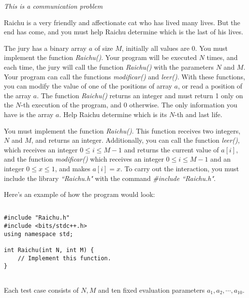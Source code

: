 \documentclass[12pt]{scrartcl}
\begin{document}
    
    {\itshape This is a communication problem}
    
    \vspace{10pt}

        Raichu is a very friendly and affectionate cat who has lived many lives. But the end has come, and you must help Raichu determine which is the last of his lives.


        The jury has a binary array $a$ of size $M$, initially all values are $0$. You must implement the function {\itshape Raichu()}. Your program will be executed $N$ times, and each time, the jury will call the function {\itshape Raichu()} with the parameters $N$ and $M$. Your program can call the functions {\itshape modificar()} and {\itshape leer()}. With these functions, you can modify the value of one of the positions of array $a$, or read a position of the array $a$. The function {\itshape Raichu()} returns an integer and must return 1 only on the $N$-th execution of the program, and 0 otherwise. The only information you have is the array $a$. Help Raichu determine which is its $N$-th and last life.


        You must implement the function {\itshape Raichu()}. This function receives two integers, $N$ and $M$, and returns an integer. Additionally, you can call the function {\itshape leer()}, which receives an integer $0 \le i \le M - 1$ and returns the current value of $a[i]$, and the function {\itshape modificar()} which receives an integer $0 \le i \le M - 1$ and an integer $0 \le x \le 1$, and makes $a[i] = x$.
        To carry out the interaction, you must include the library \textit{``Raichu.h"} with the command \textit{\#include ``Raichu.h"}.

        Here's an example of how the program would look:

\begin{verbatim}

#include "Raichu.h"
#include <bits/stdc++.h>
using namespace std;

int Raichu(int N, int M) {
    // Implement this function.
}
    
\end{verbatim}
    


        Each test case consists of $N, M$ and ten fixed evaluation parameters $a_1, a_2, \cdots, a_{10}$.
\end{document}
